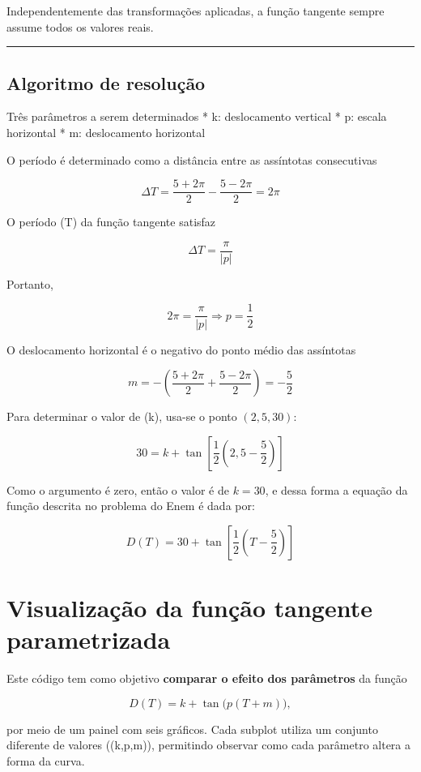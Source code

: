 \documentclass[11pt]{article}
\begin{document}
Independentemente das transformações aplicadas, a função tangente sempre
assume todos os valores reais.

\begin{center}\rule{0.5\linewidth}{0.5pt}\end{center}

\subsection{Algoritmo de resolução}\label{algoritmo-de-resoluuxe7uxe3o}

Três parâmetros a serem determinados * k: deslocamento vertical * p:
escala horizontal * m: deslocamento horizontal

O período é determinado como a distância entre as assíntotas
consecutivas

\[
\Delta T = \frac{5+2\pi}{2} - \frac{5-2\pi}{2} = 2\pi
\]

O período (\Delta T) da função tangente satisfaz

\[
\Delta T = \frac{\pi}{|p|}
\]

Portanto,

\[
2\pi = \frac{\pi}{|p|} \Rightarrow p = \frac{1}{2}
\]

O deslocamento horizontal é o negativo do ponto médio das assíntotas

\[
m = -\left( \frac{5+2\pi}{2} + \frac{5-2\pi}{2} \right) = -\frac{5}{2}
\]

Para determinar o valor de (k), usa-se o ponto \((2,5,30)\):

\[
30 = k + \tan\left[\frac{1}{2}(2{,}5 - \frac{5}{2})\right]
\]

Como o argumento é zero, então o valor é de \(k = 30\), e dessa forma a
equação da função descrita no problema do Enem é dada por:

\[
D(T) = 30 + \tan\left[\frac{1}{2}\left(T - \frac{5}{2}\right)\right]
\]

    \section{Visualização da função tangente
parametrizada}\label{visualizauxe7uxe3o-da-funuxe7uxe3o-tangente-parametrizada}

Este código tem como objetivo \textbf{comparar o efeito dos parâmetros}
da função

\[
D(T) = k + \tan\big(p(T+m)\big),
\]

por meio de um painel com seis gráficos. Cada subplot utiliza um
conjunto diferente de valores ((k,p,m)), permitindo observar como cada
parâmetro altera a forma da curva.
\end{document}

